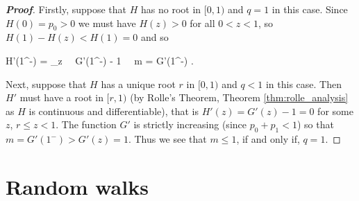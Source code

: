 \begin{proof}[\bf Proof]

Firstly, suppose that $H$ has no root in $[0, 1)$ and $q=1$ in this case. Since $H(0) = p_0 > 0$ we must have $H(z) > 0$ for all $0 < z < 1$, so $H(1) - H(z) < H(1) = 0$ and so

\be H'(1^-) = \lim_{z}   \ \ra \ G'(1^-) - 1 \ \ra\  m = G'(1^-) . \ee

Next, suppose that $H$ has a unique root $r$ in $[0, 1)$ and $q<1$ in this case. Then $H'$ must have a root in $[r, 1)$ (by Rolle's Theorem, Theorem \ref{thm:rolle_analysis} as $H$ is continuous and differentiable), that is
$H'(z) = G'(z)-1 = 0$ for some $z$, $r \leq z < 1$. The function $G'$ is strictly increasing (since $p_0 + p_1 < 1$) so that $m = G'(1^-) > G'(z) = 1$. Thus we see that $m \leq 1$, if and only if, $q = 1$.
\end{proof}


\section{Random walks}

